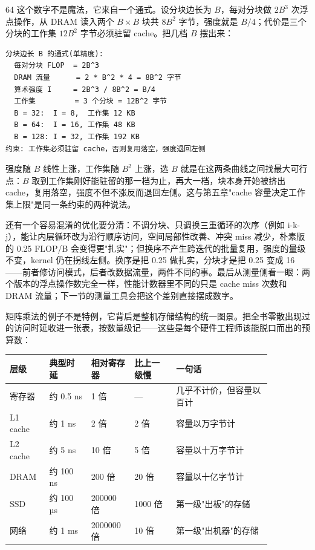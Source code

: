 64 这个数字不是魔法，它来自一个通式。设分块边长为 $B$，每对分块做 $2B^3$ 次浮点操作，从 DRAM 读入两个 $B\times B$ 块共 $8B^2$ 字节，强度就是 $B/4$；代价是三个分块的工作集 $12B^2$ 字节必须驻留 cache。把几档 $B$ 摆出来：

\begin{lstlisting}
分块边长 B 的通式(单精度):
  每对分块 FLOP  = 2B^3
  DRAM 流量      = 2 * B^2 * 4 = 8B^2 字节
  算术强度 I     = 2B^3 / 8B^2 = B/4
  工作集         = 3 个分块 = 12B^2 字节
  B = 32:  I = 8,  工作集 12 KB
  B = 64:  I = 16, 工作集 48 KB
  B = 128: I = 32, 工作集 192 KB
约束: 工作集必须驻留 cache，否则复用落空，强度退回左侧
\end{lstlisting}

强度随 $B$ 线性上涨，工作集随 $B^2$ 上涨，选 $B$ 就是在这两条曲线之间找最大可行点：$B$ 取到工作集刚好能驻留的那一档为止，再大一档，块本身开始被挤出 cache，复用落空，强度不但不涨反而退回左侧。这与第五章"cache 容量决定工作集上限"是同一条约束的两种说法。

还有一个容易混淆的优化要分清：不调分块、只调换三重循环的次序（例如 i-k-j），能让内层循环改为沿行顺序访问，空间局部性改善、冲突 miss 减少，朴素版的 0.25 FLOP/B 会变得更"扎实"；但换序不产生跨迭代的批量复用，强度的量级不变，kernel 仍在拐线左侧。换序是把 0.25 做扎实，分块才是把 0.25 变成 16——前者修访问模式，后者改数据流量，两件不同的事。最后从测量侧看一眼：两个版本的浮点操作数完全一样，性能计数器里不同的只是 cache miss 次数和 DRAM 流量；下一节的测量工具会把这个差别直接摆成数字。

矩阵乘法的例子不是特例，它背后是整机存储结构的统一图景。把全书零散出现过的访问时延收进一张表，按数量级记——这些是每个硬件工程师该能脱口而出的预算数：

\begin{longtable}{L{0.12\linewidth}L{0.14\linewidth}L{0.14\linewidth}L{0.14\linewidth}L{0.32\linewidth}}
\toprule
层级 & 典型时延 & 相对寄存器 & 比上一级慢 & 一句话 \\
\midrule
寄存器 & 约 0.5 ns & 1 倍 & — & 几乎不计价，但容量以百计 \\
L1 cache & 约 1 ns & 2 倍 & 2 倍 & 容量以万字节计 \\
L2 cache & 约 5 ns & 10 倍 & 5 倍 & 容量以十万字节计 \\
DRAM & 约 100 ns & 200 倍 & 20 倍 & 容量以十亿字节计 \\
SSD & 约 100 µs & 200000 倍 & 1000 倍 & 第一级"出板"的存储 \\
网络 & 约 1 ms & 2000000 倍 & 10 倍 & 第一级"出机器"的存储 \\
\bottomrule
\end{longtable}

